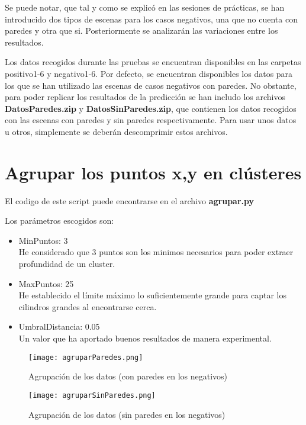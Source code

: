 Se puede notar, que tal y como se explicó en las sesiones de prácticas, se han introducido dos tipos de escenas para los casos negativos, una que no cuenta con paredes y otra que si. Posteriormente se analizarán las variaciones entre los resultados.

Los datos recogidos durante las pruebas se encuentran disponibles en las carpetas positivo1-6 y negativo1-6. Por defecto, se encuentran disponibles los datos para los que se han utilizado las escenas de casos negativos con paredes.
No obstante, para poder replicar los resultados de la predicción se han includo los archivos \textbf{DatosParedes.zip} y \textbf{DatosSinParedes.zip}, que contienen los datos recogidos con las escenas con paredes y sin paredes respectivamente. Para usar unos datos u otros, simplemente se deberán descomprimir estos archivos.

\newpage

\section{Agrupar los puntos x,y en clústeres}

El codigo de este script puede encontrarse en el archivo \textbf{agrupar.py}

Los parámetros escogidos son:
\begin{itemize}
	\item MinPuntos: 3 \\ He considerado que 3 puntos son los minimos necesarios para poder extraer profundidad de un cluster.
	\item MaxPuntos: 25 \\ He establecido el límite máximo lo suficientemente grande para captar los cilindros grandes al encontrarse cerca.
	\item UmbralDistancia: 0.05 \\ Un valor que ha aportado buenos resultados de manera experimental.
\end{itemize}


\begin{figure}[H]
	\centering
	\texttt{[image: agruparParedes.png]}
	\caption{Agrupación de los datos (con paredes en los negativos)}
\end{figure}
\begin{figure}[H]
	\centering
	\texttt{[image: agruparSinParedes.png]}
	\caption{Agrupación de los datos (sin paredes en los negativos)}
\end{figure}

